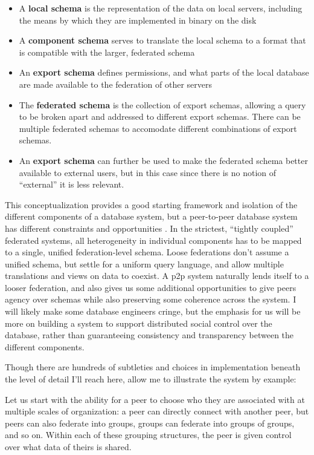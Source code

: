 \documentclass[10pt]{tufte-book}
\begin{document}
\begin{itemize}

\item
  A \textbf{local schema} is the representation of the data on local
  servers, including the means by which they are implemented in binary
  on the disk
\item
  A \textbf{component schema} serves to translate the local schema to a
  format that is compatible with the larger, federated schema
\item
  An \textbf{export schema} defines permissions, and what parts of the
  local database are made available to the federation of other servers
\item
  The \textbf{federated schema} is the collection of export schemas,
  allowing a query to be broken apart and addressed to different export
  schemas. There can be multiple federated schemas to accomodate
  different combinations of export schemas.
\item
  An \textbf{export schema} can further be used to make the federated
  schema better available to external users, but in this case since
  there is no notion of ``external'' it is less relevant.
\end{itemize}

This conceptualization provides a good starting framework and isolation
of the different components of a database system, but a peer-to-peer
database system has different constraints and opportunities \citep{bonifatiDistributedDatabasesPeertopeer2008} . In the strictest,
``tightly coupled'' federated systems, all heterogeneity in individual
components has to be mapped to a single, unified federation-level
schema. Loose federations don't assume a unified schema, but settle for
a uniform query language, and allow multiple translations and views on
data to coexist. A p2p system naturally lends itself to a looser
federation, and also gives us some additional opportunities to give
peers agency over schemas while also preserving some coherence across
the system. I will likely make some database engineers cringe, but the
emphasis for us will be more on building a system to support distributed
social control over the database, rather than guaranteeing consistency
and transparency between the different components.

Though there are hundreds of subtleties and choices in implementation
beneath the level of detail I'll reach here, allow me to illustrate the
system by example:

Let us start with the ability for a peer to choose who they are
associated with at multiple scales of organization: a peer can directly
connect with another peer, but peers can also federate into groups,
groups can federate into groups of groups, and so on. Within each of
these grouping structures, the peer is given control over what data of
theirs is shared.
\end{document}
